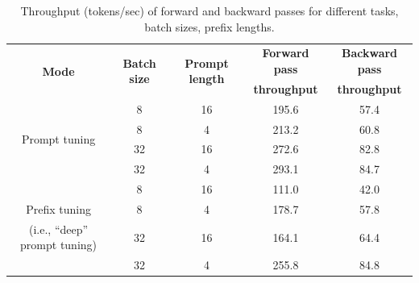 \begin{table}[tb]
  \centering
 \caption{Throughput (tokens/sec) of forward and backward passes for different tasks, batch sizes, prefix lengths.}
 \label{tbl:exp_full_step}
\setlength{\tabcolsep}{3pt}
\begin{tabular}{ccccc}\toprule
\multirow{2}{*}{\bf{Mode}} & \multirow{2}{*}{\bf{Batch size}} & \multirow{2}{*}{\bf{Prompt length}} & \bf{Forward pass} & \bf{Backward pass} \\
& & & \bf{throughput}  & \bf{throughput} \\
\midrule
\multirow{4}{*}{Prompt tuning}
& 8 & 16 & 195.6 & 57.4 \\
& 8 & 4 & 213.2 & 60.8 \\
& 32 & 16 & 272.6 & 82.8 \\
& 32 & 4 & 293.1 & 84.7 \\
\midrule
& 8 & 16 & 111.0 & 42.0 \\
Prefix tuning & 8 & 4 & 178.7 & 57.8 \\
(i.e., ``deep'' prompt tuning) & 32 & 16 & 164.1 & 64.4 \\
& 32 & 4 & 255.8 & 84.8 \\
\bottomrule
\end{tabular}
\end{table}












